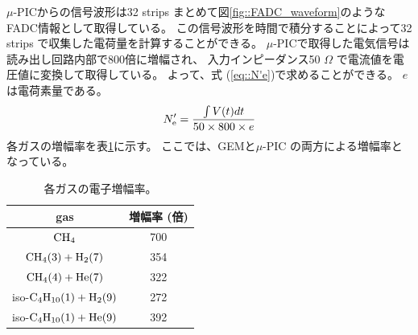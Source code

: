 \documentclass[../master]{subfiles}
\begin{document}
$\mu$-PICからの信号波形は32 strips まとめて図\ref{fig::FADC_waveform}のようなFADC情報として取得している。
この信号波形を時間で積分することによって32 strips で収集した電荷量を計算することができる。
$\mu$-PICで取得した電気信号は読み出し回路内部で800倍に増幅され、
入力インピーダンス50 $\Omega$ で電流値を電圧値に変換して取得している。
よって、式 (\ref{eq::N'e})で求めることができる。
$e$は電荷素量である。
\begin{equation}
  N'_{\rm e} = \frac{\int V (t) dt}{ 50 \times 800 \times e}
  \label{eq::N'e}
\end{equation}
各ガスの増幅率を表\ref{tab::multiplying_rate}に示す。
ここでは、GEMと$\mu$-PIC の両方による増幅率となっている。
\begin{table}
  \centering
  \caption{各ガスの電子増幅率。}
  \label{tab::multiplying_rate}
  \begin{tabular}{cc}
    \toprule
    gas & 増幅率 (倍) \\
    \midrule
    ${\rm CH_{4}}$                          & 700 \\
    ${\rm CH_{4} (3) + H_{2} (7)}$          & 354 \\
    ${\rm CH_{4} (4) + He (7)}$             & 322 \\
    iso-${\rm C_{4}H_{10} (1) + H_{2} (9)}$ & 272 \\
    iso-${\rm C_{4}H_{10} (1) + He (9)}$    & 392 \\
    \bottomrule
  \end{tabular}
\end{table}
\end{document}
